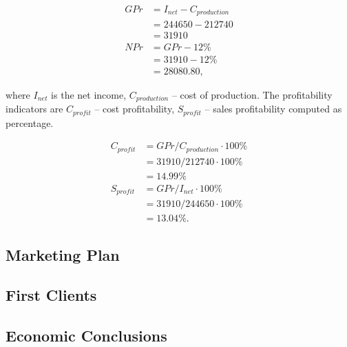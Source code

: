 \begin{equation}
 \begin{split}
GPr &= I_{net} - C_{production}\\
    &= 244650 - 212740\\
    &= 31910\\
NPr &= GPr - 12\% \\
    &= 31910 - 12\% \\
    &= 28080.80,
\end{split}
\end{equation}

\noindent where $I_{net}$ is the net income, $C_{production}$ -- cost of
production. The profitability indicators are $C_{profit}$ -- cost
profitability, $S_{profit}$ -- sales profitability computed as percentage.

\begin{equation}
 \begin{split}
  C_{profit} &= GPr / C_{production} \cdot 100\%\\
              &= 31910 / 212740 \cdot 100\% \\
              &= 14.99 \%\\
  S_{profit} &= GPr / I_{net} \cdot 100\% \\
             &= 31910 / 244650 \cdot 100\% \\
             &= 13.04 \%.
 \end{split}
\end{equation}

\subsection{Marketing Plan}

\subsection{First Clients}

\subsection{Economic Conclusions}






\clearpage
